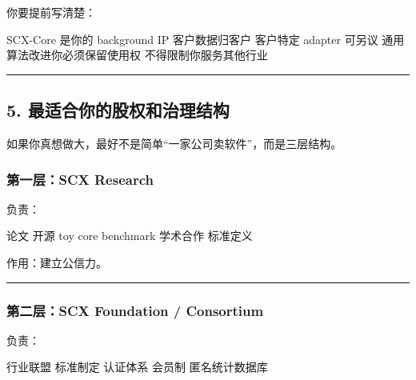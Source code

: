 \documentclass[
  12pt,
]{ctexart}
\newenvironment{Shaded}{}{}
\newcommand{\NormalTok}[1]{#1}
\begin{document}
你要提前写清楚：

\begin{Shaded}
\begin{Highlighting}[]
\NormalTok{SCX{-}Core 是你的 background IP}
\NormalTok{客户数据归客户}
\NormalTok{客户特定 adapter 可另议}
\NormalTok{通用算法改进你必须保留使用权}
\NormalTok{不得限制你服务其他行业}
\end{Highlighting}
\end{Shaded}

\begin{center}\rule{0.5\linewidth}{0.5pt}\end{center}

\subsection{5.
最适合你的股权和治理结构}\label{ux6700ux9002ux5408ux4f60ux7684ux80a1ux6743ux548cux6cbbux7406ux7ed3ux6784}

如果你真想做大，最好不是简单``一家公司卖软件''，而是三层结构。

\subsubsection{第一层：SCX
Research}\label{ux7b2cux4e00ux5c42scx-research}

负责：

\begin{Shaded}
\begin{Highlighting}[]
\NormalTok{论文}
\NormalTok{开源 toy core}
\NormalTok{benchmark}
\NormalTok{学术合作}
\NormalTok{标准定义}
\end{Highlighting}
\end{Shaded}

作用：建立公信力。

\begin{center}\rule{0.5\linewidth}{0.5pt}\end{center}

\subsubsection{第二层：SCX Foundation /
Consortium}\label{ux7b2cux4e8cux5c42scx-foundation-consortium}

负责：

\begin{Shaded}
\begin{Highlighting}[]
\NormalTok{行业联盟}
\NormalTok{标准制定}
\NormalTok{认证体系}
\NormalTok{会员制}
\NormalTok{匿名统计数据库}
\end{Highlighting}
\end{Shaded}
\end{document}
